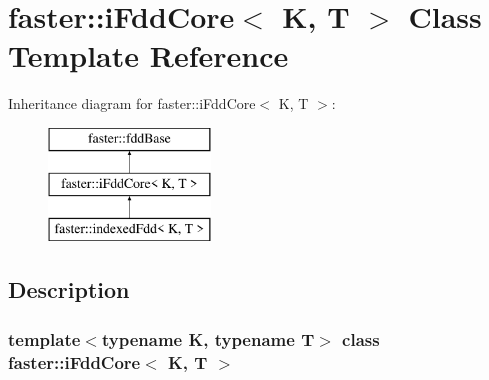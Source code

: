 \hypertarget{classfaster_1_1iFddCore}{}\section{faster\+:\+:i\+Fdd\+Core$<$ K, T $>$ Class Template Reference}
\label{classfaster_1_1iFddCore}
Inheritance diagram for faster\+:\+:i\+Fdd\+Core$<$ K, T $>$\+:\begin{figure}[H]
\begin{center}
\leavevmode
\includegraphics[height=3.000000cm]{classfaster_1_1iFddCore}
\end{center}
\end{figure}


\subsection{Description}
\subsubsection*{template$<$typename K, typename T$>$\newline
class faster\+::i\+Fdd\+Core$<$ K, T $>$}


